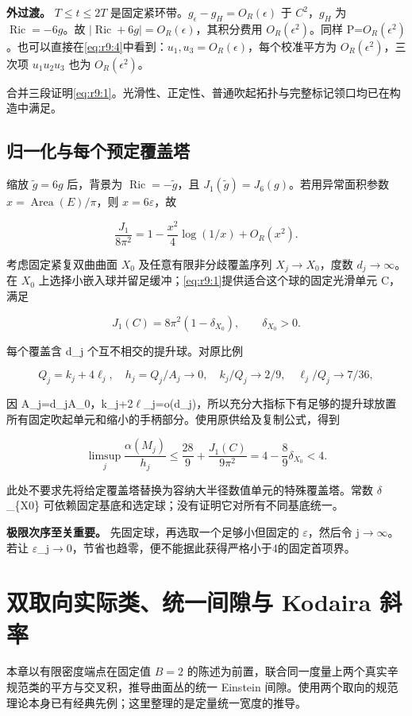\documentclass[UTF8,11pt,openany,oneside,fontset=none]{ctexbook}
\begin{document}
\textbf{外过渡。} \(T\le t\le2T\) 是固定紧环带。\(g_\epsilon-g_H=O_R(\epsilon)\) 于 \(C^2\)，\(g_H\) 为 \(\operatorname{Ric}=-6g\)。故 \(|\operatorname{Ric}+6g|=O_R(\epsilon)\)，其积分费用 \(O_R(\epsilon^2)\)。同样 P=\(O_R(\epsilon^2)\)。也可以直接在\eqref{eq:r9:4}中看到：\(u_1,u_3=O_R(\epsilon)\)，每个校准平方为 \(O_R(\epsilon^2)\)，三次项 \(u_1u_2u_3\) 也为 \(O_R(\epsilon^2)\)。

合并三段证明\eqref{eq:r9:1}。光滑性、正定性、普通吹起拓扑与完整标记领口均已在构造中满足。

\section{归一化与每个预定覆盖塔}\label{ch9:ux5f52ux4e00ux5316ux4e0eux6bcfux4e2aux9884ux5b9aux8986ux76d6ux5854}

缩放 \(\widetilde g=6g\) 后，背景为 \(\operatorname{Ric}=-\widetilde g\)，且 \(J_1(\widetilde g)=J_6(g)\)。若用异常面积参数 \(x=\operatorname{Area}(E)/\pi\)，则 \(x=6\varepsilon\)，故

\[
\frac{J_1}{8\pi^2}
=1-\frac{x^2}{4}\log(1/x)+O_R(x^2).
\]

考虑固定紧复双曲曲面 \(X_0\) 及任意有限非分歧覆盖序列 \(X_j\to X_0\)，度数 \(d_j\to\infty\)。在 \(X_0\) 上选择小嵌入球并留足缓冲；\eqref{eq:r9:1}提供适合这个球的固定光滑单元 C，满足

\[
 J_1(C)=8\pi^2(1-\delta_{X_0}),\qquad\delta_{X_0}>0.
\]

每个覆盖含 d\_j 个互不相交的提升球。对原比例

\[
 Q_j=k_j+4\ell_j,\quad h_j=Q_j/A_j\to0,\quad
 k_j/Q_j\to2/9,\quad \ell_j/Q_j\to7/36,
\]

因 A\_j=d\_jA\_0，k\_j+2\(\ell\)\_j=o(d\_j)，所以充分大指标下有足够的提升球放置所有固定吹起单元和缩小的手柄部分。使用原供给及复制公式，得到

\[
\boxed{
\limsup_j\frac{\alpha(M_j)}{h_j}
\le\frac{28}{9}+\frac{J_1(C)}{9\pi^2}
=4-\frac89\delta_{X_0}<4.
}
\tag{9.8}\label{eq:r9:8}
\]

此处不要求先将给定覆盖塔替换为容纳大半径数值单元的特殊覆盖塔。常数 \(\delta\)\_\{X0\} 可依赖固定基底和选定球；没有证明它对所有不同基底统一。

\textbf{极限次序至关重要。} 先固定球，再选取一个足够小但固定的 \(\varepsilon\)，然后令 j\(\to\)\(\infty\)。若让 \(\varepsilon\)\_j\(\to\)0，节省也趋零，便不能据此获得严格小于4的固定首项界。


\chapter{双取向实际类、统一间隙与 Kodaira 斜率}\label{chapter:10}
本章以有限密度端点在固定值 \(B=2\) 的陈述为前置，联合同一度量上两个真实辛规范类的平方与交叉积，推导曲面丛的统一 Einstein 间隙。使用两个取向的规范理论本身已有经典先例；这里整理的是定量统一宽度的推导。\cite{R10,FD,Kotschick,LeBrunKodaira}
\end{document}
